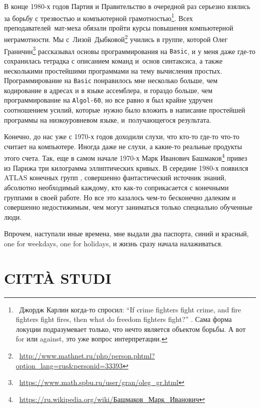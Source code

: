 \documentclass[intlimits,twoside,a4paper,11pt]{article}
\begin{document}
	В конце 1980-х годов Партия и Правительство в очередной раз серьезно взялись за 
	борьбу с трезвостью
	и компьютерной грамотностью\footnote{~Джордж Карлин когда-то спросил:
		``If crime fighters fight crime, and fire fighters fight fires, then what do freedom fighters fight?''
		\cite{C}. Сама форма локуции подразумевает только, что нечто является объектом
		борьбы. А вот for или against, это уже вопрос интерпретации.}. Всех преподавателей~мат-ме\-ха обязали пройти курсы
	повышения компьютерной неграмотности. Мы с~Лизой~Дыб\-ковой\footnote{~\url{http://www.mathnet.ru/php/person.phtml?option\_lang=rus\&personid=33393}} 
	учились в группе, 
	которой Олег Граничин\footnote{~\url{https://www.math.spbu.ru/user/gran/oleg\_gr.html}}
	рассказывал основы программи\-рования на {\tt Basic}, и у меня 
	даже где-то сохранилась тетрадка с описанием команд и~ос\-нов синтаксиса, а также 
	несколькими простейшими программами на тему вычисления простых. 
	Программирование на {\tt Basic} понравилось
	мне несколько больше, чем кодиро\-вание в адресах и в языке ассемблера, и 
	гораздо больше, чем программирование на {\tt Algol-60}, но все равно я был крайне 
	удручен 
	соотношением усилий, которые~нужно было вложить в написание простейшей программы 
	на низкоуровневом языке, и~по\-лучающегося результата.
	\par
	Конечно, до нас уже с 1970-х годов доходили слухи, что кто-то где-то что-то считает 
	на компьютере. Иногда даже не слухи, а какие-то реальные продукты этого счета. 
	Так, еще в самом начале 1970-х Марк Иванович 
	Башмаков\footnote{~\href{https://ru.wikipedia.org/wiki/Башмаков\_Марк\_Иванович}{https://ru.wikipedia.org/wiki/Башмаков\_Марк\_Иванович}}
	привез из Парижа три килограмма эллиптических кривых. В середине 1980-х
	появился ATLAS конечных групп \cite{CCNPW}, совершенно фантастический 
	источник знаний, абсолютно необходимый каждому, кто как-то соприкасается с 
	конечными группами в своей работе. Но все это казалось чем-то бесконечно 
	далеким и совершенно недостижимым, чем могут заниматься только специально 
	обученные люди.
	\par
	Впрочем, наступали иные времена, мне выдали два паспорта, синий и красный,
	one for weekdays, one for holidays, и жизнь сразу начала налаживаться.
	
	
	\section{CITT\`A STUDI}
	
\end{document}
